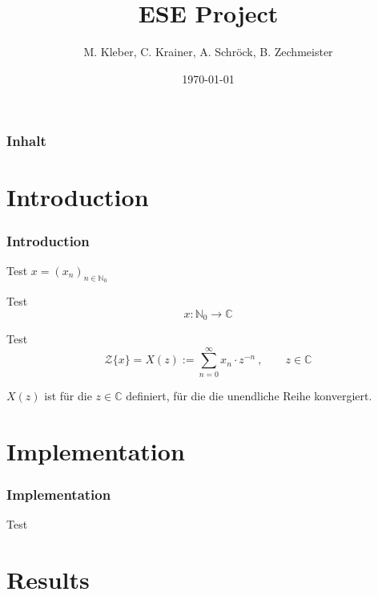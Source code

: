 \documentclass{beamer}
\title{ESE Project}
\author{M. Kleber, C. Krainer, A. Schr\"ock, B. Zechmeister}
\institute[University of Salzburg]
{
Department of Computer Sciences\\
  University of Salzburg, Austria
}
\date{\today}
\begin{document}
\begin{frame}
\titlepage
\end{frame}

\begin{frame}
\frametitle{Inhalt}
\tableofcontents
\end{frame}


\section{Introduction}

\begin{frame}
\frametitle{Introduction}

Test $\displaystyle{x = (x_n)_{n\in\mathds{N}_0}}$

Test
\begin{equation}
	x : \mathds{N}_0 \rightarrow \mathds{C}
\end{equation}

\pause

Test
\begin{equation}
	\mathcal{Z}\{x\} =
	X(z) := \sum_{n=0}^\infty x_n\cdot z^{-n} ~, \qquad z\in \mathds{C}
\end{equation}

\pause
\vspace{0.5cm}
$\displaystyle{X(z)}$ ist f\"ur die $\displaystyle{z\in\mathds{C}}$ definiert, f\"ur die die
unendliche Reihe konvergiert.


\end{frame}


\section{Implementation}

\begin{frame}
\frametitle{Implementation}

Test

\end{frame}




\section{Results}
\end{document}
